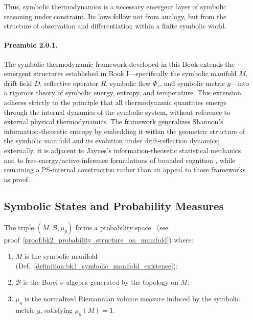 Thus, symbolic thermodynamics is a necessary emergent layer of symbolic reasoning under constraint. Its laws follow not from analogy, but from the structure of observation and differentiation within a finite symbolic world.

\paragraph{Preamble 2.0.1.} The symbolic thermodynamic framework developed in this Book extends the emergent structures established in Book I—specifically the symbolic manifold $M$, drift field $D$, reflective operator $R$, symbolic flow $\Phi_s$, and symbolic metric $g$—into a rigorous theory of symbolic energy, entropy, and temperature. This extension adheres strictly to the principle that all thermodynamic quantities emerge through the internal dynamics of the symbolic system, without reference to external physical thermodynamics. The framework generalizes Shannon's information-theoretic entropy \cite{shannon1948mathematical} by embedding it within the geometric structure of the symbolic manifold and its evolution under drift-reflection dynamics; externally, it is adjacent to Jaynes's information-theoretic statistical mechanics \cite{jaynes1957information} and to free-energy/active-inference formulations of bounded cognition \cite{friston2010,parr2022active}, while remaining a PS-internal construction rather than an appeal to those frameworks as proof.

\subsection{Symbolic States and Probability Measures} 
\label{subsec:bk2_symbolic_states_probability_measures}

\begin{definition} 
\label{definition:bk2_symbolic_probability_spa} 
The triple $(M, \mathcal{B}, \mu_g)$ forms a probability space%
~(see proof~\ref{proof:bk2_probability_structure_on_manifold})
where:
\begin{enumerate}
    \item $M$ is the symbolic manifold (Def.~\ref{definition:bk1_symbolic_manifold_existence});
    \item $\mathcal{B}$ is the Borel $\sigma$-algebra generated by the topology on $M$;
    \item $\mu_g$ is the normalized Riemannian volume measure induced by the symbolic metric $g$, satisfying $\mu_g(M) = 1$.
\end{enumerate}
\end{definition}


